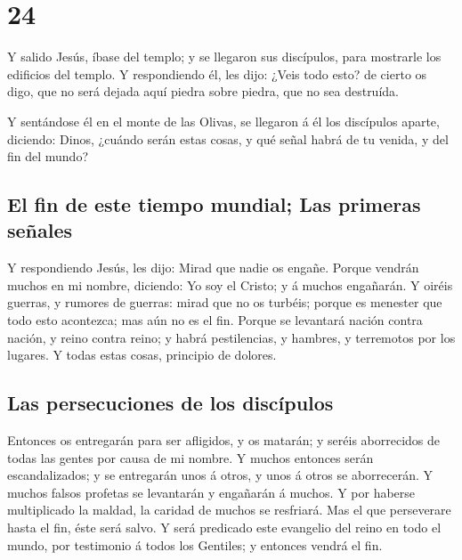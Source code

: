 \hypertarget{section-40-24}{%
\section{24}\label{section-40-24}}

 Y salido Jesús, íbase del templo; y se llegaron sus
discípulos, para mostrarle los edificios del templo.  Y
respondiendo él, les dijo: ¿Veis todo esto? de cierto os digo, que no
será dejada aquí piedra sobre piedra, que no sea destruída.

 Y sentándose él en el monte de las Olivas, se llegaron á
él los discípulos aparte, diciendo: Dinos, ¿cuándo serán estas cosas, y
qué señal habrá de tu venida, y del fin del mundo?

\hypertarget{el-fin-de-este-tiempo-mundial-las-primeras-seuxf1ales}{%
\subsection{El fin de este tiempo mundial; Las primeras
señales}\label{el-fin-de-este-tiempo-mundial-las-primeras-seuxf1ales}}

 Y respondiendo Jesús, les dijo: Mirad que nadie os
engañe.  Porque vendrán muchos en mi nombre, diciendo: Yo
soy el Cristo; y á muchos engañarán.  Y oiréis guerras, y
rumores de guerras: mirad que no os turbéis; porque es menester que todo
esto acontezca; mas aún no es el fin.  Porque se levantará
nación contra nación, y reino contra reino; y habrá pestilencias, y
hambres, y terremotos por los lugares.  Y todas estas
cosas, principio de dolores.

\hypertarget{las-persecuciones-de-los-discuxedpulos}{%
\subsection{Las persecuciones de los
discípulos}\label{las-persecuciones-de-los-discuxedpulos}}

 Entonces os entregarán para ser afligidos, y os matarán;
y seréis aborrecidos de todas las gentes por causa de mi nombre.
 Y muchos entonces serán escandalizados; y se entregarán
unos á otros, y unos á otros se aborrecerán.  Y muchos
falsos profetas se levantarán y engañarán á muchos.  Y
por haberse multiplicado la maldad, la caridad de muchos se resfriará.
 Mas el que perseverare hasta el fin, éste será salvo.
 Y será predicado este evangelio del reino en todo el
mundo, por testimonio á todos los Gentiles; y entonces vendrá el fin.

